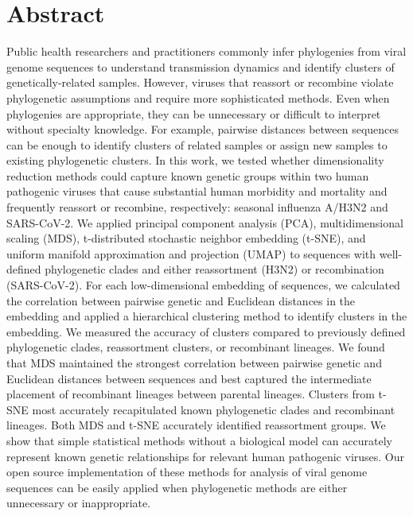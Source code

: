 \documentclass[10pt,letterpaper]{article}
\begin{document}
\section*{Abstract}
Public health researchers and practitioners commonly infer phylogenies from viral genome sequences to understand transmission dynamics and identify clusters of genetically-related samples.
However, viruses that reassort or recombine violate phylogenetic assumptions and require more sophisticated methods.
Even when phylogenies are appropriate, they can be unnecessary or difficult to interpret without specialty knowledge.
For example, pairwise distances between sequences can be enough to identify clusters of related samples or assign new samples to existing phylogenetic clusters.
In this work, we tested whether dimensionality reduction methods could capture known genetic groups within two human pathogenic viruses that cause substantial human morbidity and mortality and frequently reassort or recombine, respectively: seasonal influenza A/H3N2 and SARS-CoV-2.
We applied principal component analysis (PCA), multidimensional scaling (MDS), t-distributed stochastic neighbor embedding (t-SNE), and uniform manifold approximation and projection (UMAP) to sequences with well-defined phylogenetic clades and either reassortment (H3N2) or recombination (SARS-CoV-2).
For each low-dimensional embedding of sequences, we calculated the correlation between pairwise genetic and Euclidean distances in the embedding and applied a hierarchical clustering method to identify clusters in the embedding.
We measured the accuracy of clusters compared to previously defined phylogenetic clades, reassortment clusters, or recombinant lineages.
We found that MDS maintained the strongest correlation between pairwise genetic and Euclidean distances between sequences and best captured the intermediate placement of recombinant lineages between parental lineages.
Clusters from t-SNE most accurately recapitulated known phylogenetic clades and recombinant lineages.
Both MDS and t-SNE accurately identified reassortment groups.
We show that simple statistical methods without a biological model can accurately represent known genetic relationships for relevant human pathogenic viruses.
Our open source implementation of these methods for analysis of viral genome sequences can be easily applied when phylogenetic methods are either unnecessary or inappropriate.

\end{document}
